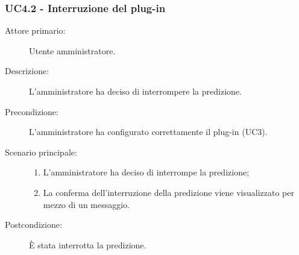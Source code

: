 \subsubsection{UC4.2 - Interruzione del plug-in}
\label{sssec:uc4.2}
\begin{description}
  \item[Attore primario:] Utente amministratore.
  \item[Descrizione:] L'amministratore ha deciso di interrompere la predizione.
  \item[Precondizione:] L'amministratore ha configurato correttamente il plug-in (UC3).
  \item[Scenario principale:]
  \begin{enumerate}
    \item L'amministratore ha deciso di interrompe la predizione;
    \item La conferma dell'interruzione della predizione viene visualizzato per mezzo di un messaggio.
  \end{enumerate}
  \item[Postcondizione:] È stata interrotta la predizione.
\end{description}


